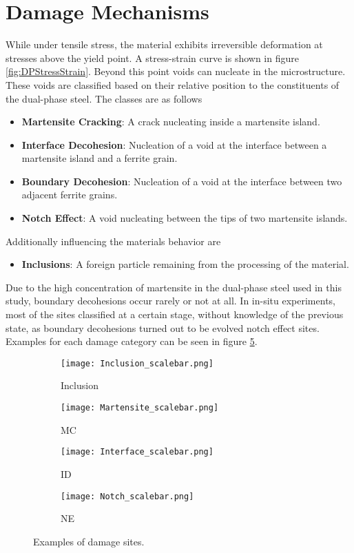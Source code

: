 \section{Damage Mechanisms}

While under tensile stress, the material exhibits irreversible deformation at stresses above the yield point. A stress-strain curve is shown in figure \ref{fig:DPStressStrain}. Beyond this point voids can nucleate in the microstructure. These voids are classified based on their relative position to the constituents of the dual-phase steel. The classes are as follows
\begin{itemize}[label={}]
\item \textbf{Martensite Cracking}: A crack nucleating inside a martensite island.
\item \textbf{Interface Decohesion}: Nucleation of a void at the interface between a martensite island and a ferrite grain.
\item \textbf{Boundary Decohesion}: Nucleation of a void at the interface between two adjacent ferrite grains.
\item \textbf{Notch Effect}: A void nucleating between the tips of two martensite islands. 
\end{itemize}
Additionally influencing the materials behavior are
\begin{itemize}[label={}]
\item \textbf{Inclusions}: A foreign particle remaining from the processing of the material. 
\end{itemize}
Due to the high concentration of martensite in the dual-phase steel used in this study, boundary decohesions occur rarely or not at all. In in-situ experiments, most of the sites classified at a certain stage, without knowledge of the previous state, as boundary decohesions turned out to be evolved notch effect sites. Examples for each damage category can be seen in figure \ref{fig:DamageCategories}.\\

\begin{figure}
\centering
\begin{subfigure}{.25\textwidth}
\centering
  \texttt{[image: Inclusion\_scalebar.png]}
  \caption{Inclusion}
  \label{fig:Inclusion_scalebar}
\end{subfigure}%
\begin{subfigure}{.25\textwidth}
\centering
  \texttt{[image: Martensite\_scalebar.png]}
  \caption{MC}
  \label{fig:Martensite_scalebar}
\end{subfigure}%
\begin{subfigure}{.25\textwidth}
\centering
  \texttt{[image: Interface\_scalebar.png]}
  \caption{ID}
  \label{fig:Interface_scalebar}
\end{subfigure}%
\begin{subfigure}{.25\textwidth}
\centering
  \texttt{[image: Notch\_scalebar.png]}
  \caption{NE}
  \label{fig:Notch_scalebar}
\end{subfigure}%
\caption{Examples of damage sites.}
\label{fig:DamageCategories}
\end{figure}

